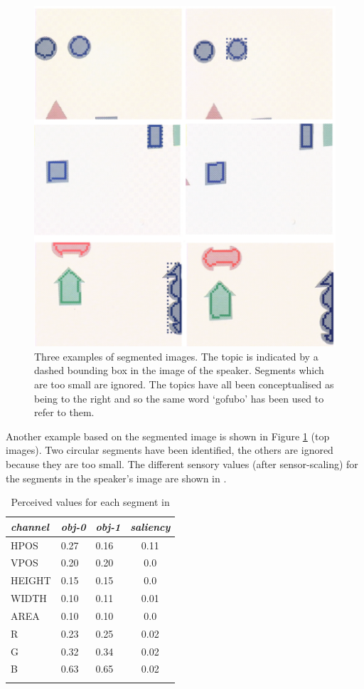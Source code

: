 \begin{figure}
\begin{center}
\includegraphics[width=0.8\columnwidth]{chap7/figs/plate-10}
\end{center}
\caption{Three examples of segmented images. The 
topic is indicated by a dashed bounding box in the 
image of the speaker. Segments which are too small 
are ignored. The topics have all been conceptualised
as being to the right and so the same word 
`gofubo' has been used to refer to them. }
\label{f:plate-10}
\end{figure}

Another example based on the segmented image is shown in Figure 
\ref{f:plate-10} (top images). Two circular segments
have been identified, the others are ignored because they are 
too small. The different sensory values (after sensor-scaling)
for the segments in the speaker's image are shown in . 


\begin{table}
\begin{center}
\begin{tabular}{  l   l   l   c  } \lsptoprule
{\itshape channel}& {\itshape obj-0} & {\itshape obj-1} & {\itshape saliency}\\ \midrule
HPOS & 0.27 & 0.16 & 0.11\\ 
VPOS & 0.20 & 0.20 & 0.0\\ 
HEIGHT & 0.15 & 0.15 & 0.0\\ 
WIDTH & 0.10 & 0.11 & 0.01\\ 
AREA & 0.10 & 0.10 & 0.0\\ 
R & 0.23 & 0.25 & 0.02\\ 
G & 0.32 & 0.34 & 0.02\\ 
B & 0.63 & 0.65 & 0.02\\ 
\lspbottomrule
\end{tabular}
\caption{Perceived values for each segment in 
\label{tab:t-plate10}}
\end{center}
\end{table}

